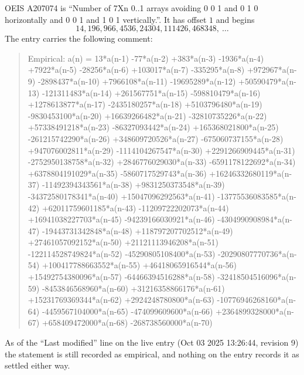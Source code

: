 \documentclass[11pt,a4paper]{article}
\theoremstyle{plain}
\theoremstyle{definition}
\begin{document}
OEIS A207074 is ``Number of 7Xn 0..1 arrays avoiding 0 0 1 and 0 1 0 horizontally and 0 0 1 and 1 0 1 vertically.''. It has offset
$1$ and begins
\[
14, 196, 966, 4536, 24304, 111426, 468348,\ \dots
\]
The entry carries the following comment:
\begin{quote}\small
Empirical: a(n) = 13*a(n-1) -77*a(n-2) +383*a(n-3) -1936*a(n-4) +7922*a(n-5) -28256*a(n-6) +103017*a(n-7) -335295*a(n-8) +972967*a(n-9) -2898437*a(n-10) +7966108*a(n-11) -19695289*a(n-12) +50590479*a(n-13) -121311483*a(n-14) +261567751*a(n-15) -598810479*a(n-16) +1278613877*a(n-17) -2435180257*a(n-18) +5103796480*a(n-19) -9830453100*a(n-20) +16639266482*a(n-21) -32810735226*a(n-22) +57338491218*a(n-23) -86327093442*a(n-24) +165368021800*a(n-25) -261215742290*a(n-26) +348609720526*a(n-27) -675060737155*a(n-28) +947076002811*a(n-29) -1114104267547*a(n-30) +2291266909445*a(n-31) -2752950138758*a(n-32) +2846776029030*a(n-33) -6591178122692*a(n-34) +6378804191029*a(n-35) -5860717529743*a(n-36) +16246332680119*a(n-37) -11492394343561*a(n-38) +9831250373548*a(n-39) -34372580178341*a(n-40) +15047096292563*a(n-41) -13775536083585*a(n-42) +62011759601185*a(n-43) -11209722202073*a(n-44) +16941038227703*a(n-45) -94239166030921*a(n-46) -4304990908984*a(n-47) -19443731342848*a(n-48) +118797207702512*a(n-49) +27461057092152*a(n-50) +21121113946208*a(n-51) -122114528749824*a(n-52) -45290805108400*a(n-53) -20290807770736*a(n-54) +100417788663552*a(n-55) +46418065916544*a(n-56) +15492754380096*a(n-57) -64466394516288*a(n-58) -32418504516096*a(n-59) -8453846568960*a(n-60) +31216358866176*a(n-61) +15231769369344*a(n-62) +2924248780800*a(n-63) -10776946268160*a(n-64) -4459567104000*a(n-65) -474099609600*a(n-66) +2364899328000*a(n-67) +658409472000*a(n-68) -268738560000*a(n-70)
\end{quote}
As of the ``Last modified'' line on the live entry (Oct 03 2025 13:26:44, revision
9) the statement is still recorded as empirical, and nothing on the entry
records it as settled either way.
\end{document}
